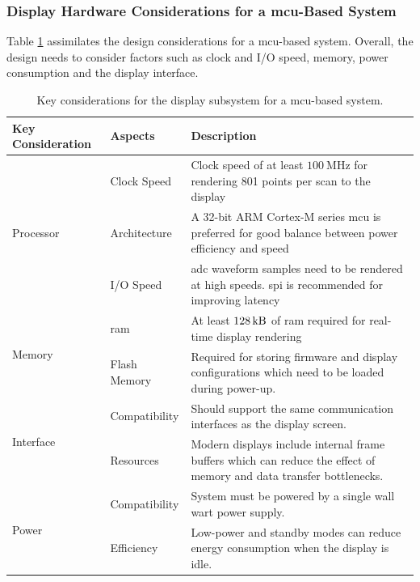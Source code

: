 \documentclass[class=report,11pt,crop=false]{standalone}
\begin{document}
	
	\subsubsection{Display Hardware Considerations for a \acrshort{mcu}-Based System}
	
	Table \ref{tab:mcu-display-options} assimilates the design considerations for a \acrshort{mcu}-based system. Overall, the design needs to consider factors such as clock and I/O speed, memory, power consumption and the display interface.
	
	\begin{table}[ht!]
		\centering
		\begin{tabular}{|m{5em}|m{10em}|m{24em}|}
			\hline
			\textbf{Key Consideration}	&	\textbf{Aspects}	& \textbf{Description}\\
			\hline
			\multirow{3}{*}{Processor}	& Clock Speed	& Clock speed of at least $\SI{100}{\mega\hertz}$ for rendering 801 points per scan to the display\\
			\cline{2-3}
			&	Architecture &	A 32-bit ARM Cortex-M series \acrshort{mcu} is preferred for good balance between power efficiency and speed\\
			\cline{2-3}
			&	I/O Speed & \acrshort{adc} waveform samples need to be rendered at high speeds. \acrshort{spi} is recommended for improving latency\\
			\hline
			\multirow{2}{*}{Memory}	& 	\acrshort{ram}	& At least $\SI{128}{\kilo\byte}$ of \acrshort{ram} required for real-time display rendering\\
			\cline{2-3}
			&	Flash Memory	&	Required for storing firmware and display configurations which need to be loaded during power-up.\\
			\hline
			\multirow{2}{*}{Interface}	&	Compatibility	& Should support the same communication interfaces as the display screen.\\
			\cline{2-3}
			&	Resources &	Modern displays include internal frame buffers which can reduce the effect of memory and data transfer bottlenecks.\\
			\hline
			\multirow{2}{*}{Power}	&	Compatibility & System must be powered by a single wall wart power supply.\\
			\cline{2-3}
			&	Efficiency	&	Low-power and standby modes can reduce energy consumption when the display is idle.\\
			\hline
		\end{tabular}
		\caption{Key considerations for the display subsystem for a \acrshort{mcu}-based system.}
		\label{tab:mcu-display-options}
	\end{table}
	
\end{document}
